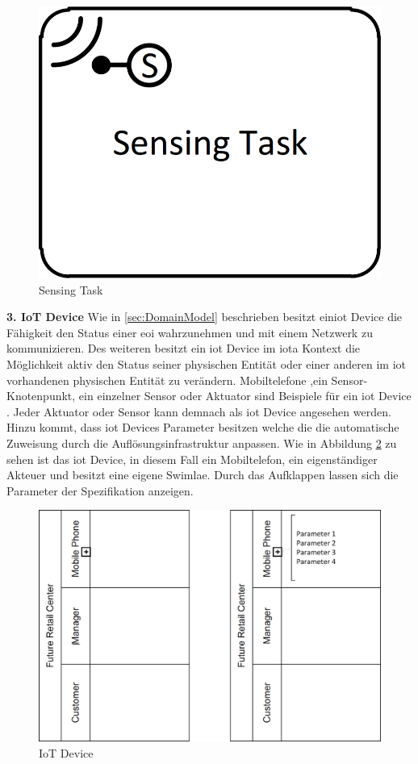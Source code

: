 \documentclass[a4paper, 12pt, twoside, headsepline=true]{scrartcl} %
\begin{document}
\begin{figure}[H]
	\includegraphics[height=3 cm,keepaspectratio,center]{figures/SensingTask}
	\caption{Sensing Task \cite[S.49]{conceptsiotawarepm}}
	\label{fig:sensingtask}
\end{figure} 

\textbf{3. IoT Device}
\newline
Wie in \ref{sec:DomainModel} beschrieben besitzt ein\ac{iot} Device die Fähigkeit den Status einer \ac{eoi} wahrzunehmen und mit einem Netzwerk zu kommunizieren. Des weiteren besitzt ein \ac{iot} Device im \ac{iota} Kontext die Möglichkeit aktiv den Status seiner physischen Entität oder einer anderen im \ac{iot} vorhandenen physischen Entität zu verändern. Mobiltelefone  ,ein Sensor-Knotenpunkt, ein einzelner Sensor oder Aktuator sind Beispiele für ein \ac{iot} Device \cite[S.50]{conceptsiotawarepm}. Jeder Aktuator oder Sensor kann demnach als \ac{iot} Device angesehen werden. Hinzu kommt, dass \ac{iot} Devices Parameter besitzen welche die die automatische Zuweisung durch die Auflösungsinfrastruktur anpassen. %
Wie in Abbildung \ref{fig:iotdevice} zu sehen ist das \ac{iot} Device, in diesem Fall ein Mobiltelefon, ein eigenständiger Akteuer und besitzt eine eigene Swimlae. Durch das Aufklappen lassen sich die Parameter der Spezifikation anzeigen.


\begin{figure}[H]
	\includegraphics[height=8 cm,keepaspectratio,center]{figures/IoTDevice}
	\caption{IoT Device \cite[S.53]{conceptsiotawarepm}}
	\label{fig:iotdevice}
\end{figure} 
\end{document}
